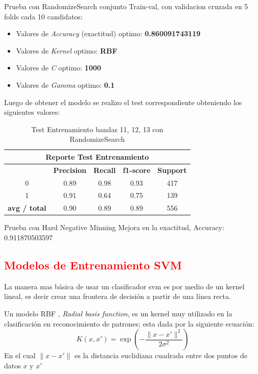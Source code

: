 Prueba con RandomizeSearch conjunto Train-val, con validacion cruzada en 5 folds cada 10 candidatos:

\begin{itemize}
\item Valores de \textit{Accuracy} (exactitud) optimo: \textbf{0.860091743119}
\item Valores de \textit{Kernel} optimo: \textbf{RBF}
\item Valores de \textit{C} optimo: \textbf{1000} 	
\item Valores de \textit{Gamma} optimo: \textbf{0.1}

\end{itemize}

Luego de obtener el modelo se realizo el test correspondiente obteniendo los siguientes valores:
\begin{table}[H]
\begin{center}
\begin{tabular}{|c|c|c|c|c|}
\hline \multicolumn{5}{|c|}{Reporte Test Entrenamiento} \\ \hline
\hline \textbf{} & \textbf{Precision} & \textbf{Recall} & \textbf{f1-score} & \textbf{Support}\\ \hline 
				 0   & 0.89 & 0.98 & 0.93  & 417	\\ \hline 
				 1   & 0.91 & 0.64  & 0.75 & 139 \\ \hline 
\textbf{avg / total} & 0.90 & 0.89 & 0.89  & 556 \\ \hline
\end{tabular}
\end{center} \caption{Test Entrenamiento bandas 11, 12, 13 con RandomizeSearch}\label{tab:RandomTest111213}
\end{table}


Prueba con Hard Negative Minning
Mejora en la exactitud, Accuracy: 0.911870503597





\textcolor{red}{\subsection{Modelos de Entrenamiento SVM}\label{sub:linealModel}}

La manera mas básica de usar un clasificador \ac{svm} es por medio de un kernel lineal, es decir crear una frontera de decisión a partir de una línea 
recta. 

Un modelo RBF , \textit{Radial basis function}, es un kernel muy utilizado en la clasificación en reconocimiento de patrones; esta dada por la siguiente ecuación:
\begin{equation}
K(x,x')=\exp(-\frac{ \|x-x'\|^2}{2\sigma^2} )
\end{equation}\label{ec: ecuacionrbf}
En el cual \(\|x-x'\|\) es la distancia euclidiana cuadrada entre dos puntos de datos \(x\) y \(x'\)






